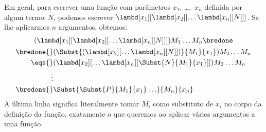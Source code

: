 \documentclass[../../../include/open-logic-section]{subfiles}
\begin{document}
Em geral, para escrever uma função com parâmetros $x_1$, \dots,~$x_n$
definida por algum termo~$N$, podemos escrever
$\lambd[x_1][\lambd[x_2][\ldots\lambd[x_n][N]]]$. Se lhe aplicarmos $n$
argumentos, obtemos:
\begin{multline*}
  (\lambd[x_1][\lambd[x_2][\ldots\lambd[x_n][N]]]) M_1 \dots M_n \bredone\\
  \begin{aligned}
  \bredone {} & (\Subst{(\lambd[x_2][\ldots\lambd[x_n][N]])}{M_1}{x_1}) M_2
  \dots M_n\\
   \eqs {} & (\lambd[x_2][\ldots\lambd[x_n][\Subst{N}{M_1}{x_1}]]) M_2
            \dots M_n \\
  \vdots & \\
  \bredone {} &\Subst{\Subst{P}{M_1}{x_1}\ldots}{M_n}{x_n}
  \end{aligned}
\end{multline*}
A última linha significa literalmente tomar $M_i$ como substituto de $x_i$ no corpo
da definição da função, exatamente o que queremos ao aplicar vários
argumentos a uma função.
\end{document}
